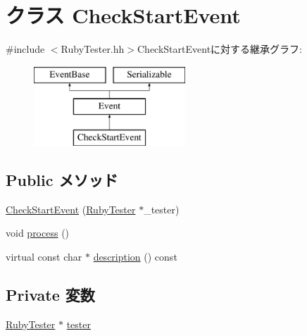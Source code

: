\hypertarget{classRubyTester_1_1CheckStartEvent}{
\section{クラス CheckStartEvent}
\label{classRubyTester_1_1CheckStartEvent}
}


{\ttfamily \#include $<$RubyTester.hh$>$}CheckStartEventに対する継承グラフ:\begin{figure}[H]
\begin{center}
\leavevmode
\includegraphics[height=3cm]{classRubyTester_1_1CheckStartEvent}
\end{center}
\end{figure}
\subsection*{Public メソッド}
\begin{DoxyCompactItemize}
\item 
\hyperlink{classRubyTester_1_1CheckStartEvent_a9cbfe98e2db247039e328f1fa0fa9533}{CheckStartEvent} (\hyperlink{classRubyTester_1_1RubyTester}{RubyTester} $\ast$\_\-tester)
\item 
void \hyperlink{classRubyTester_1_1CheckStartEvent_a2e9c5136d19b1a95fc427e0852deab5c}{process} ()
\item 
virtual const char $\ast$ \hyperlink{classRubyTester_1_1CheckStartEvent_a130ddddf003422b413e2e891b1b80e8f}{description} () const 
\end{DoxyCompactItemize}
\subsection*{Private 変数}
\begin{DoxyCompactItemize}
\item 
\hyperlink{classRubyTester_1_1RubyTester}{RubyTester} $\ast$ \hyperlink{classRubyTester_1_1CheckStartEvent_a5f8ba0d5be58d6302adaccb375d74bc2}{tester}
\end{DoxyCompactItemize}


